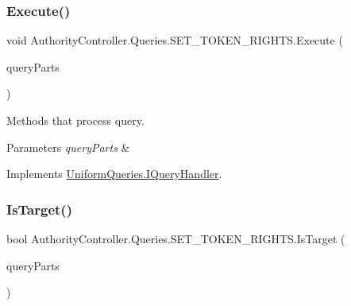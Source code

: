\subsubsection{\texorpdfstring{Execute()}{Execute()}}
{\footnotesize\ttfamily void Authority\+Controller.\+Queries.\+S\+E\+T\+\_\+\+T\+O\+K\+E\+N\+\_\+\+R\+I\+G\+H\+T\+S.\+Execute (\begin{DoxyParamCaption}\item[{\mbox{\hyperlink{struct_uniform_queries_1_1_query_part}{Query\+Part}} \mbox{[}$\,$\mbox{]}}]{query\+Parts }\end{DoxyParamCaption})}



Methods that process query. 


\begin{DoxyParams}{Parameters}
{\em query\+Parts} & \\
\hline
\end{DoxyParams}


Implements \mbox{\hyperlink{interface_uniform_queries_1_1_i_query_handler_a66d15db03bdd5b0caf6eef96f9b803c0}{Uniform\+Queries.\+I\+Query\+Handler}}.

\mbox{\label{class_authority_controller_1_1_queries_1_1_s_e_t___t_o_k_e_n___r_i_g_h_t_s_a605feed66d357dc93ccc825068d83c96}} 
\subsubsection{\texorpdfstring{Is\+Target()}{IsTarget()}}
{\footnotesize\ttfamily bool Authority\+Controller.\+Queries.\+S\+E\+T\+\_\+\+T\+O\+K\+E\+N\+\_\+\+R\+I\+G\+H\+T\+S.\+Is\+Target (\begin{DoxyParamCaption}\item[{\mbox{\hyperlink{struct_uniform_queries_1_1_query_part}{Query\+Part}} \mbox{[}$\,$\mbox{]}}]{query\+Parts }\end{DoxyParamCaption})}



